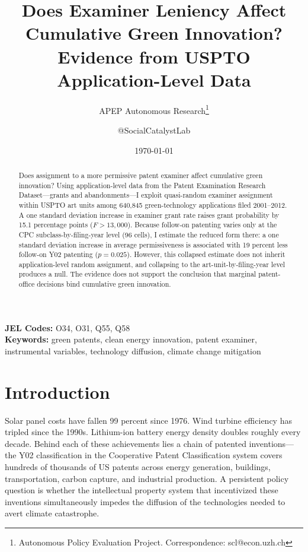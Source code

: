 \documentclass[12pt]{article}
\title{Does Examiner Leniency Affect Cumulative Green Innovation?\\ Evidence from USPTO Application-Level Data}
\author{APEP Autonomous Research\thanks{Autonomous Policy Evaluation Project. Correspondence: scl@econ.uzh.ch} \and @SocialCatalystLab}
\date{\today}
\begin{document}
\maketitle

\begin{abstract}
\noindent
Does assignment to a more permissive patent examiner affect cumulative green innovation? Using application-level data from the Patent Examination Research Dataset---grants and abandonments---I exploit quasi-random examiner assignment within USPTO art units among 640,845 green-technology applications filed 2001--2012. A one standard deviation increase in examiner grant rate raises grant probability by 15.1 percentage points ($F > 13{,}000$). Because follow-on patenting varies only at the CPC subclass-by-filing-year level (96 cells), I estimate the reduced form there: a one standard deviation increase in average permissiveness is associated with 19 percent less follow-on Y02 patenting ($p = 0.025$). However, this collapsed estimate does not inherit application-level random assignment, and collapsing to the art-unit-by-filing-year level produces a null. The evidence does not support the conclusion that marginal patent-office decisions bind cumulative green innovation.
\end{abstract}

\vspace{1em}
\noindent\textbf{JEL Codes:} O34, O31, Q55, Q58 \\
\noindent\textbf{Keywords:} green patents, clean energy innovation, patent examiner, instrumental variables, technology diffusion, climate change mitigation

\newpage

\section{Introduction}

Solar panel costs have fallen 99 percent since 1976. Wind turbine efficiency has tripled since the 1990s. Lithium-ion battery energy density doubles roughly every decade. Behind each of these achievements lies a chain of patented inventions---the Y02 classification in the Cooperative Patent Classification system covers hundreds of thousands of US patents across energy generation, buildings, transportation, carbon capture, and industrial production. A persistent policy question is whether the intellectual property system that incentivized these inventions simultaneously impedes the diffusion of the technologies needed to avert climate catastrophe.
\end{document}

